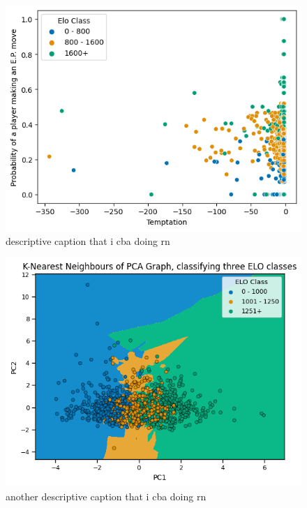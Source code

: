 \documentclass[10pt,a4paper,twocolumn]{article}
\begin{document}
\begin{figure}[t]
  \centering
  \includegraphics{report/images/temptation_chart.png}
  \caption{descriptive caption that i cba doing rn}
  \label{fds-project-template:fig:temptation}
\end{figure}

\begin{figure}[t]
  \centering
  \includegraphics{report/images/knn_graph.png}
  \caption{another descriptive caption that i cba doing rn}
  \label{fds-project-template:fig:knn}
\end{figure}
\end{document}

